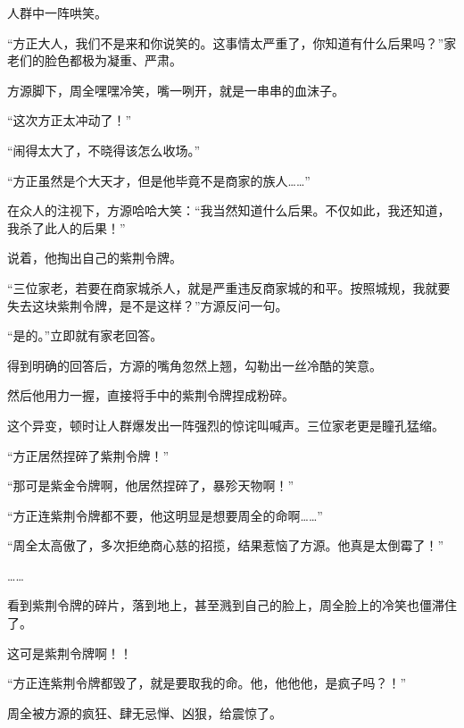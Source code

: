 \begin{this_body}
人群中一阵哄笑。

“方正大人，我们不是来和你说笑的。这事情太严重了，你知道有什么后果吗？”家老们的脸色都极为凝重、严肃。

方源脚下，周全嘿嘿冷笑，嘴一咧开，就是一串串的血沫子。

“这次方正太冲动了！”

“闹得太大了，不晓得该怎么收场。”

“方正虽然是个大天才，但是他毕竟不是商家的族人……”

在众人的注视下，方源哈哈大笑：“我当然知道什么后果。不仅如此，我还知道，我杀了此人的后果！”

说着，他掏出自己的紫荆令牌。

“三位家老，若要在商家城杀人，就是严重违反商家城的和平。按照城规，我就要失去这块紫荆令牌，是不是这样？”方源反问一句。

“是的。”立即就有家老回答。

得到明确的回答后，方源的嘴角忽然上翘，勾勒出一丝冷酷的笑意。

然后他用力一握，直接将手中的紫荆令牌捏成粉碎。

这个异变，顿时让人群爆发出一阵强烈的惊诧叫喊声。三位家老更是瞳孔猛缩。

“方正居然捏碎了紫荆令牌！”

“那可是紫金令牌啊，他居然捏碎了，暴殄天物啊！”

“方正连紫荆令牌都不要，他这明显是想要周全的命啊……”

“周全太高傲了，多次拒绝商心慈的招揽，结果惹恼了方源。他真是太倒霉了！”

……

看到紫荆令牌的碎片，落到地上，甚至溅到自己的脸上，周全脸上的冷笑也僵滞住了。

这可是紫荆令牌啊！！

“方正连紫荆令牌都毁了，就是要取我的命。他，他他他，是疯子吗？！”

周全被方源的疯狂、肆无忌惮、凶狠，给震惊了。

\end{this_body}


